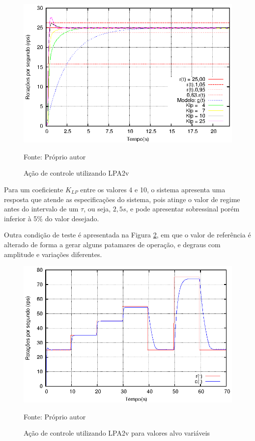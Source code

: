\begin{figure}[!htb]
\caption{Ação de controle utilizando LPA2v}
\vspace{-0.5cm}\center\includegraphics[scale=1.5]{./imagens/klpAll.eps}
\label{fig:acaoLPA2v}

{\small Fonte: Próprio autor}
\end{figure}

Para um coeficiente $K_{LP}$ entre os valores 4 e 10, 
o sistema apresenta uma resposta que 
atende as especificações do sistema, 
pois atinge o valor de regime antes do intervalo de um $\tau$, ou seja,
$2,5s$, e pode apresentar sobressinal porém inferior à 5\% do valor desejado.


Outra condição de teste é apresentada na Figura \ref{fig:acaoLPA2vpatam85}, 
em  que o valor de referência é alterado de forma a gerar alguns patamares
de operação, e degraus com amplitude e variações diferentes.


\begin{figure}[!htb]
\caption{Ação de controle utilizando LPA2v para valores alvo variáveis}
\vspace{-1cm}
\center\includegraphics[scale=1.5]{./imagens/patam85.eps}
\label{fig:acaoLPA2vpatam85}

{\small Fonte: Próprio autor}
\end{figure}


